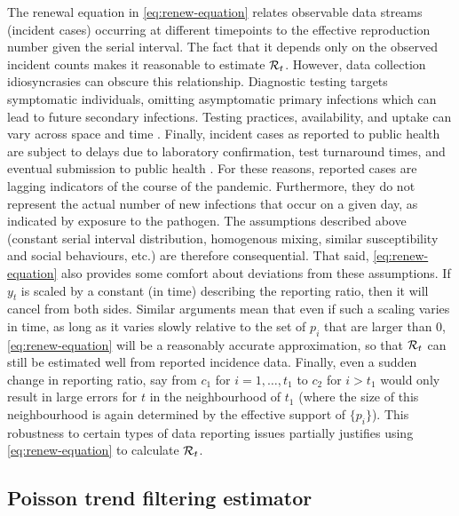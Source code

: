 The renewal equation in \eqref{eq:renew-equation} relates observable data
streams (incident cases) occurring at different timepoints to the effective reproduction
number given the serial interval. The fact that it depends only on the observed
incident counts makes it reasonable to estimate $\mathcal{R}_t$. However, 
data collection idiosyncrasies can obscure this relationship. Diagnostic testing
targets symptomatic individuals, omitting asymptomatic primary infections which
can lead to future secondary infections. Testing practices, availability, and
uptake can vary across space and time \citep{pitzer2021impact,
hitchings2021usefulness}. Finally, incident cases as reported to public health
are subject to delays due to laboratory confirmation, test turnaround times, and
eventual submission to public health \citep{pellis2021challenges}. For these
reasons, reported cases are lagging indicators of the course of the pandemic.
Furthermore, they do not represent the actual number of new infections that
occur on a given day, as indicated by exposure to the pathogen. The assumptions
described above (constant serial interval distribution, homogenous mixing,
similar susceptibility and social behaviours, etc.) are therefore consequential.
That said, \eqref{eq:renew-equation} also provides some comfort about deviations
from these assumptions. If $y_t$ is scaled by a constant (in time) describing
the reporting ratio, then it will cancel from both sides. Similar arguments mean
that even if such a scaling varies in time, as long as it varies slowly relative
to the set of $p_i$ that are larger than 0, \eqref{eq:renew-equation} will be a
reasonably accurate approximation, so that $\mathcal{R}_t$ can still be estimated well
from reported incidence data. Finally, even a sudden change in reporting ratio, 
say from $c_1$ for $i=1,\ldots,t_1$ to $c_2$ for $i>t_1$ would only result in 
large errors for $t$ in the neighbourhood of $t_1$ (where the size of this 
neighbourhood is again determined by the effective support of $\{p_i\}$). 
This robustness to certain types of data reporting issues partially justifies 
using \eqref{eq:renew-equation} to calculate $\mathcal{R}_t$.


\subsection{Poisson trend filtering estimator} 

